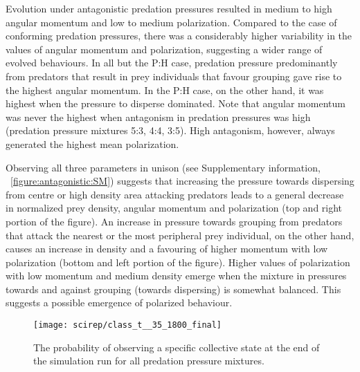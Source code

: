Evolution under antagonistic predation pressures resulted in medium to high angular momentum and low to medium polarization. Compared to the case of conforming predation pressures, there was a considerably higher variability in the values of angular momentum and polarization, suggesting a wider range of evolved behaviours. In all but the P:H case, predation pressure predominantly from predators that result in prey individuals that favour grouping gave rise to the highest angular momentum. In the P:H case, on the other hand, it was highest when the pressure to disperse dominated. Note that angular momentum was never the highest when antagonism in predation pressures was high (predation pressure mixtures 5:3, 4:4, 3:5). High antagonism, however, always generated the highest mean polarization.

Observing all three parameters in unison (see Supplementary information, \figurename~\ref{figure:antagonistic:SM}) suggests that increasing the pressure towards dispersing from centre or high density area attacking predators leads to a general decrease in normalized prey density, angular momentum and polarization (top and right portion of the figure). An increase in pressure towards grouping from predators that attack the nearest or the most peripheral prey individual, on the other hand, causes an increase in density and a favouring of higher momentum with low polarization (bottom and left portion of the figure). Higher values of polarization with low momentum and medium density emerge when the mixture in pressures towards and against grouping (towards dispersing) is somewhat balanced. This suggests a possible emergence of polarized behaviour. 

\begin{figure}
	\texttt{[image: scirep/class\_t\_\_35\_1800\_final]}
	\caption{The probability of observing a specific collective state at the end of the simulation run for all predation pressure mixtures.}
	\label{figure:classification}
\end{figure}

